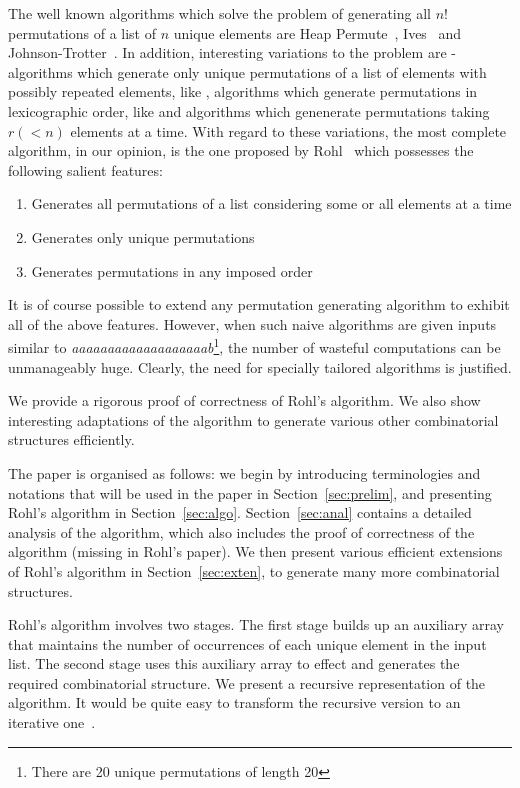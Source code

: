 \documentclass{article}
\begin{document}
The well known algorithms which solve the problem of generating all $n!$ permutations of a list of $n$ unique elements are Heap Permute~\cite{heap_permute}, Ives~\cite{ives_perm} and Johnson-Trotter~\cite{trotter_perm}. In addition, interesting variations to the problem are - algorithms which generate only unique permutations of a list of elements with possibly repeated elements, like \cite{bratley_unique, chase_unique, sag_repetitions}, algorithms which generate permutations in lexicographic order, like \cite{smith_lexico1, schrack_lexico, shen_lexico} and algorithms which genenerate permutations taking $r (< n)$ elements at a time. With regard to these variations, the most complete algorithm, in our opinion, is the one proposed by Rohl~\cite{rohl1} which possesses the following salient features:
\begin{enumerate}
\item Generates all permutations of a list considering some or all elements at a time
\item Generates only unique permutations
\item Generates permutations in any imposed order
\end{enumerate}
It is of course possible to extend any permutation generating algorithm to exhibit all of the above features. However, when such naive algorithms are given inputs similar to \emph{aaaaaaaaaaaaaaaaaaab}\footnote{There are 20 unique permutations of length 20}, the number of wasteful computations can be unmanageably huge. Clearly, the need for specially tailored algorithms is justified.

We provide a rigorous proof of correctness of Rohl's algorithm. We also show interesting adaptations of the algorithm to generate various other combinatorial structures efficiently.

The paper is organised as follows: we begin by introducing terminologies and notations that will be used in the paper in Section~\ref{sec:prelim}, and presenting Rohl's algorithm in Section~\ref{sec:algo}. Section~\ref{sec:anal} contains a detailed analysis of the algorithm, which also includes the proof of correctness of the algorithm (missing in Rohl's paper). We then present various efficient extensions of Rohl's algorithm in Section~\ref{sec:exten}, to generate many more combinatorial structures.

Rohl's algorithm involves two stages. The first stage builds up an auxiliary array that maintains the number of occurrences of each unique element in the input list. The second stage uses this auxiliary array to effect and generates the required combinatorial structure. We present a recursive representation of the algorithm. It would be quite easy to transform the recursive version to an iterative one~\cite{rec2iter}.
\end{document}

